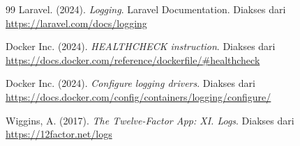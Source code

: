 \documentclass[a4paper,oneside,11pt]{book}
\begin{document}
\renewcommand{\bibname}{Daftar Pustaka}
\begin{thebibliography}{99}
  Laravel. (2024). \textit{Logging}. Laravel Documentation.
  Diakses dari \url{https://laravel.com/docs/logging}

  Docker Inc. (2024). \textit{HEALTHCHECK instruction}.
  Diakses dari \url{https://docs.docker.com/reference/dockerfile/\#healthcheck}

  Docker Inc. (2024). \textit{Configure logging drivers}.
  Diakses dari \url{https://docs.docker.com/config/containers/logging/configure/}

  Wiggins, A. (2017). \textit{The Twelve-Factor App: XI. Logs}.
  Diakses dari \url{https://12factor.net/logs}
\end{thebibliography}
\end{document}

